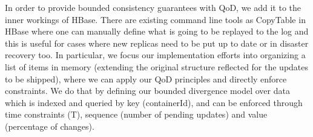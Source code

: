 In order to provide bounded consistency guarantees with QoD, we add it to the inner workings of HBase. There are existing command line tools as CopyTable in HBase where one can manually define what is going to be replayed to the log and this is useful for cases where new replicas need to be put up to date or in disaster recovery too. In particular, we focus our implementation efforts into organizing a list of items in memory (extending the original structure reflected for the updates to be shipped), where we can apply our QoD principles and directly enforce constraints. We do that by defining our bounded divergence model over data which is indexed and queried by key (containerId), and can be enforced through time constraints (T), sequence (number of pending updates) and value (percentage of changes).